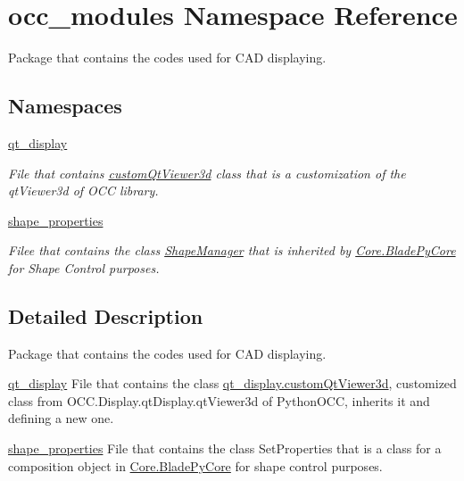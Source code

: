 \hypertarget{namespaceocc__modules}{}\section{occ\+\_\+modules Namespace Reference}
\label{namespaceocc__modules}


Package that contains the codes used for C\+AD displaying.  


\subsection*{Namespaces}
\begin{DoxyCompactItemize}
\item 
 \hyperlink{namespaceocc__modules_1_1qt__display}{qt\+\_\+display}
\begin{DoxyCompactList}\small\item\em File that contains \hyperlink{classocc__modules_1_1qt__display_1_1custom_qt_viewer3d}{custom\+Qt\+Viewer3d} class that is a customization of the qt\+Viewer3d of O\+CC library. \end{DoxyCompactList}\item 
 \hyperlink{namespaceocc__modules_1_1shape__properties}{shape\+\_\+properties}
\begin{DoxyCompactList}\small\item\em Filee that contains the class \hyperlink{classocc__modules_1_1shape__properties_1_1_shape_manager}{Shape\+Manager} that is inherited by \hyperlink{class_core_1_1_blade_py_core}{Core.\+Blade\+Py\+Core} for Shape Control purposes. \end{DoxyCompactList}\end{DoxyCompactItemize}


\subsection{Detailed Description}
Package that contains the codes used for C\+AD displaying. 

\begin{DoxyItemize}
\item {\ttfamily \hyperlink{namespaceocc__modules_1_1qt__display}{qt\+\_\+display}} File that contains the class \hyperlink{classocc__modules_1_1qt__display_1_1custom_qt_viewer3d}{qt\+\_\+display.\+custom\+Qt\+Viewer3d}, customized class from O\+C\+C.\+Display.\+qt\+Display.\+qt\+Viewer3d of Python\+O\+CC, inherits it and defining a new one.\end{DoxyItemize}
\begin{DoxyItemize}
\item {\ttfamily \hyperlink{namespaceocc__modules_1_1shape__properties}{shape\+\_\+properties}} File that contains the class Set\+Properties that is a class for a composition object in \hyperlink{class_core_1_1_blade_py_core}{Core.\+Blade\+Py\+Core} for shape control purposes. \end{DoxyItemize}
